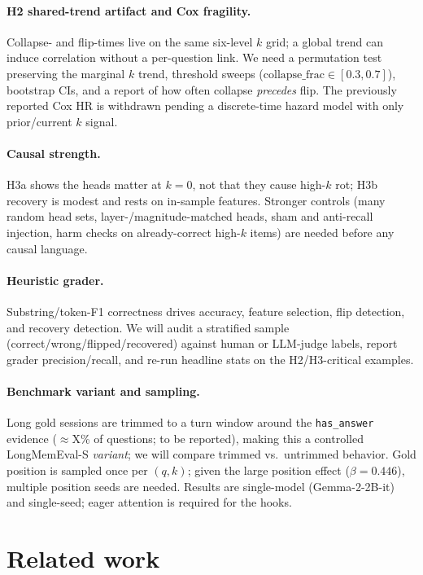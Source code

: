 \documentclass[10pt,twocolumn]{article}
\newcommand{\kof}[1]{k\!=\!#1}
\begin{document}
\paragraph{H2 shared-trend artifact and Cox fragility.} Collapse- and flip-times
live on the same six-level $k$ grid; a global trend can induce correlation
without a per-question link. We need a permutation test preserving the marginal
$k$ trend, threshold sweeps ($\text{collapse\_frac}\in[0.3,0.7]$), bootstrap CIs,
and a report of how often collapse \emph{precedes} flip. The previously reported
Cox HR is withdrawn pending a discrete-time hazard model with only prior/current
$k$ signal.

\paragraph{Causal strength.} H3a shows the heads matter at $\kof{0}$, not that
they cause high-$k$ rot; H3b recovery is modest and rests on in-sample features.
Stronger controls (many random head sets, layer-/magnitude-matched heads, sham
and anti-recall injection, harm checks on already-correct high-$k$ items) are
needed before any causal language.

\paragraph{Heuristic grader.} Substring/token-F1 correctness drives accuracy,
feature selection, flip detection, and recovery detection. We will audit a
stratified sample (correct/wrong/flipped/recovered) against human or LLM-judge
labels, report grader precision/recall, and re-run headline stats on the
H2/H3-critical examples.

\paragraph{Benchmark variant and sampling.} Long gold sessions are trimmed to a
turn window around the \texttt{has\_answer} evidence ($\approx$X\% of questions;
to be reported), making this a controlled LongMemEval-S \emph{variant}; we will
compare trimmed vs.\ untrimmed behavior. Gold position is sampled once per
$(q,k)$; given the large position effect ($\beta=0.446$), multiple position seeds
are needed. Results are single-model (Gemma-2-2B-it) and single-seed; eager
attention is required for the hooks.

\section{Related work}
\end{document}
